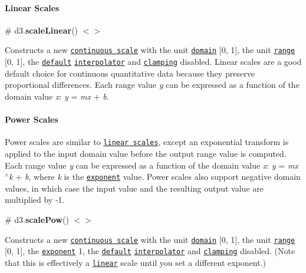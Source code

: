 \paragraph*{Linear Scales}

\label{_scaleLinear}%
\# d3.{\bfseries scale\+Linear}() \href{https://github.com/d3/d3-scale/blob/master/src/linear.js}{\tt $<$$>$}

Constructs a new \href{#continuous-scales}{\tt continuous scale} with the unit \href{#continuous_domain}{\tt domain} \mbox{[}0, 1\mbox{]}, the unit \href{#continuous_range}{\tt range} \mbox{[}0, 1\mbox{]}, the \href{https://github.com/d3/d3-interpolate#interpolate}{\tt default} \href{#continuous_interpolate}{\tt interpolator} and \href{#continuous_clamp}{\tt clamping} disabled. Linear scales are a good default choice for continuous quantitative data because they preserve proportional differences. Each range value {\itshape y} can be expressed as a function of the domain value {\itshape x}\+: {\itshape y} = {\itshape mx} + {\itshape b}.

\paragraph*{Power Scales}

Power scales are similar to \href{#linear-scales}{\tt linear scales}, except an exponential transform is applied to the input domain value before the output range value is computed. Each range value {\itshape y} can be expressed as a function of the domain value {\itshape x}\+: {\itshape y} = {\itshape mx$^\wedge$k} + {\itshape b}, where {\itshape k} is the \href{#pow_exponent}{\tt exponent} value. Power scales also support negative domain values, in which case the input value and the resulting output value are multiplied by -\/1.

\label{_scalePow}%
\# d3.{\bfseries scale\+Pow}() \href{https://github.com/d3/d3-scale/blob/master/src/pow.js}{\tt $<$$>$}

Constructs a new \href{#continuous-scales}{\tt continuous scale} with the unit \href{#continuous_domain}{\tt domain} \mbox{[}0, 1\mbox{]}, the unit \href{#continuous_range}{\tt range} \mbox{[}0, 1\mbox{]}, the \href{#pow_exponent}{\tt exponent} 1, the \href{https://github.com/d3/d3-interpolate#interpolate}{\tt default} \href{#continuous_interpolate}{\tt interpolator} and \href{#continuous_clamp}{\tt clamping} disabled. (Note that this is effectively a \href{#linear-scales}{\tt linear} scale until you set a different exponent.)


